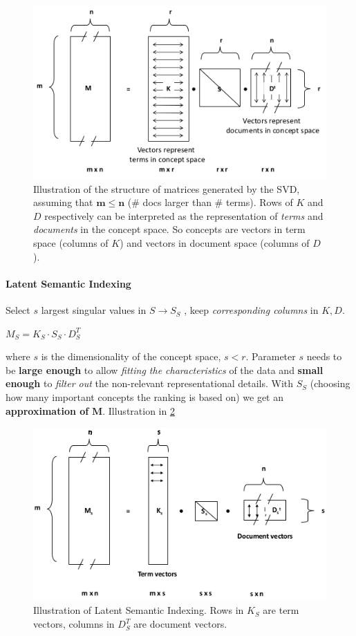 \begin{figure}
  \centering
  \includegraphics[width=\linewidth]{figures/svd.png}
  \caption{Illustration of the structure of matrices generated by the SVD, assuming that $\mathbf{m \leq n}$ (\# docs larger than \# terms). Rows of $K$ and $D$ respectively can be interpreted as the representation of \emph{terms} and \emph{documents} in the concept space. So concepts are vectors in term space (columns of $K$) and vectors in document space (columns of $D$).}
  \label{fig:svd}
\end{figure}

\paragraph{Latent Semantic Indexing} Select $s$ largest singular values in $S \longrightarrow S_S$ , keep \emph{corresponding columns} in $K, D$.
\begin{center}
  $M_S = K_S \cdot S_S \cdot D_S^T$
\end{center}
where $ s$ is the dimensionality of the concept space, $s < r$. Parameter $s$ needs to be \textbf{large enough} to allow \emph{fitting the characteristics} of the data and \textbf{small enough} to \emph{filter out} the non-relevant representational details. With $S_S$ (choosing how many important concepts the ranking is based on) we get an \textbf{approximation of} $\mathbf{M}$. Illustration in \cref{fig:ill_LSI}

\begin{figure}
  \centering
  \includegraphics[width=\linewidth]{figures/ill_LSI.png}
  \caption{Illustration of Latent Semantic Indexing. Rows in $K_S$ are term vectors, columns in $D_S^T$ are document vectors.}
  \label{fig:ill_LSI}
\end{figure}

